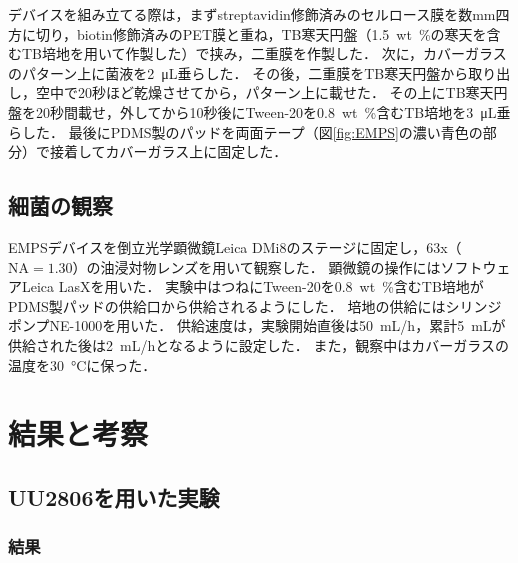\documentclass[a4paper,11pt,titlepage]{jsarticle}
\begin{document}
デバイスを組み立てる際は，まずstreptavidin修飾済みのセルロース膜を数mm四方に切り，biotin修飾済みのPET膜と重ね，TB寒天円盤（\SI{1.5}{wt\%}の寒天を含むTB培地を用いて作製した）で挟み，二重膜を作製した．
次に，カバーガラスのパターン上に菌液を\SI{2}{\uL}垂らした．
その後，二重膜をTB寒天円盤から取り出し，空中で20秒ほど乾燥させてから，パターン上に載せた．
その上にTB寒天円盤を20秒間載せ，外してから10秒後にTween-20を\SI{0.8}{wt\%}含むTB培地を\SI{3}{\uL}垂らした．
最後にPDMS製のパッドを両面テープ（図\ref{fig:EMPS}の濃い青色の部分）で接着してカバーガラス上に固定した．

\subsection{細菌の観察}
EMPSデバイスを倒立光学顕微鏡Leica DMi8のステージに固定し，63x（$\mathrm{NA}=1.30$）の油浸対物レンズを用いて観察した．
顕微鏡の操作にはソフトウェアLeica LasXを用いた．
実験中はつねにTween-20を\SI{0.8}{wt\%}含むTB培地がPDMS製パッドの供給口から供給されるようにした．
培地の供給にはシリンジポンプNE-1000を用いた．
供給速度は，実験開始直後は\SI{50}{\mL/h}，累計\SI{5}{\mL}が供給された後は\SI{2}{\mL/h}となるように設定した．
また，観察中はカバーガラスの温度を\SI{30}{\degreeCelsius}に保った．

\section{結果と考察}

\subsection{UU2806を用いた実験}
\subsubsection{結果}
\end{document}
